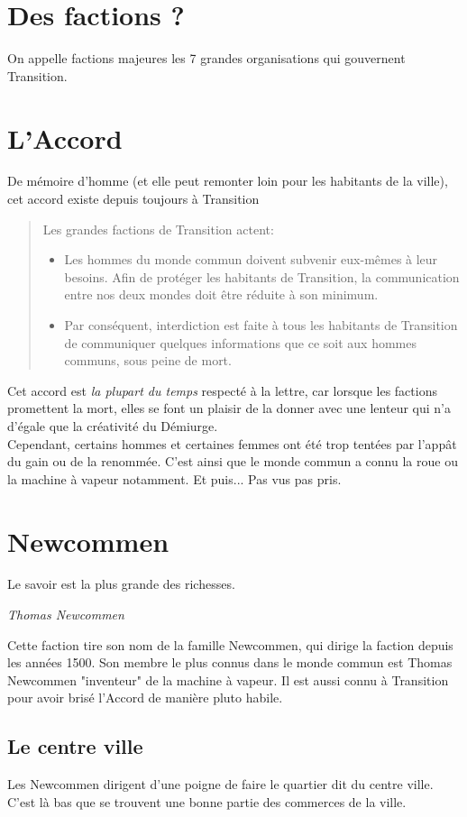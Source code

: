 \documentclass{book}
\begin{document}
\section{Des factions ?}
On appelle factions majeures les 7 grandes organisations qui gouvernent Transition.
\hypertarget{accord}{\section{L'Accord}}
De mémoire d'homme (et elle peut remonter loin pour les habitants de la ville), cet accord existe depuis toujours à Transition
\begin{quote}
	Les grandes factions de Transition actent:
	\begin{itemize}
		\item Les hommes du monde commun doivent subvenir eux-mêmes à leur besoins. Afin de protéger les habitants de Transition, la communication entre nos deux mondes doit être réduite à son minimum.
		\item Par conséquent, interdiction est faite à tous les habitants de Transition de communiquer quelques informations que ce soit aux hommes communs, sous peine de mort.
	\end{itemize}
\end{quote}
Cet accord est \emph{la plupart du temps} respecté à la lettre, car lorsque les factions promettent la mort, elles se font un plaisir de la donner avec une lenteur qui n'a d'égale que la créativité du Démiurge.
\\
Cependant, certains hommes et certaines femmes ont été trop tentées par l'appât du gain ou de la renommée. C'est ainsi que le monde commun a connu la roue ou la machine à vapeur notamment. Et puis... Pas vus pas pris.

\section{Newcommen}
\epigraph{Le savoir est la plus grande des richesses.}{\textit{Thomas Newcommen}}
Cette faction tire son nom de la famille Newcommen, qui dirige la faction depuis les années 1500. Son membre le plus connus dans le monde commun est Thomas Newcommen "inventeur" de la machine à vapeur. Il est aussi connu à Transition pour avoir brisé l'Accord de manière pluto habile.

\subsection{Le centre ville}
Les Newcommen dirigent d'une poigne de faire le quartier dit du centre ville. C'est là bas que se trouvent une bonne partie des commerces de la ville.
\end{document}
